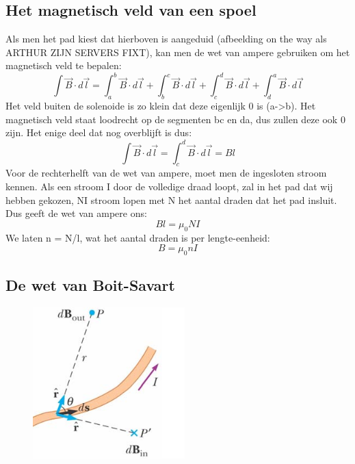 \documentclass[12pt,a4paper]{article}
\begin{document}
    \subsection{Het magnetisch veld van een spoel}
    
    Als men het pad kiest dat hierboven is aangeduid (afbeelding on the way als ARTHUR ZIJN SERVERS FIXT), kan men de wet van ampere gebruiken om het magnetisch veld te bepalen: 
    \[\int\vec{B}\cdot d\vec{l} = \int_a^b\vec{B}\cdot d\vec{l} + \int_b^c\vec{B}\cdot d\vec{l} + \int_c^d\vec{B}\cdot d\vec{l} + \int_d^a\vec{B}\cdot d\vec{l}\]
    Het veld buiten de solenoide is zo klein dat deze eigenlijk 0 is (a->b). Het magnetisch veld staat loodrecht op de segmenten bc en da, dus zullen deze ook 0 zijn. Het enige deel dat nog overblijft is dus: 
    \[\int\vec{B}\cdot d\vec{l} = \int_c^d\vec{B}\cdot d\vec{l} = Bl\]
    Voor de rechterhelft van de wet van ampere, moet men de ingesloten stroom kennen. Als een stroom I door de volledige draad loopt, zal in het pad dat wij hebben gekozen, NI stroom lopen met N het aantal draden dat het pad insluit. Dus geeft de wet van ampere ons: 
    \[Bl = \mu_0NI\]
    We laten n = N/l, wat het aantal draden is per lengte-eenheid: 
    \[B = \mu_0nI\]
    \subsection{De wet van Boit-Savart}
    \begin{figure}[h]
    	\centering
    	\includegraphics[width=0.4\linewidth]{images/28.6}
    \end{figure}
    
\end{document}
